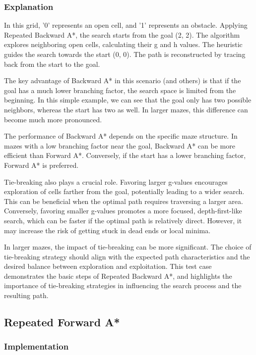 \documentclass[12pt]{article}
\begin{document}
\subsubsection{Explanation}

In this grid, 
'0' represents an open cell, 
and '1' represents an obstacle. 
Applying Repeated Backward A*, 
the search starts from the goal (2, 2). 
The algorithm explores neighboring open cells, 
calculating their g and h values. 
The heuristic guides the search towards the start (0, 0). 
The path is reconstructed by tracing back from the start to the goal.

The key advantage of Backward A* in this scenario 
(and others) 
is that if the goal has a much lower branching factor, 
the search space is limited from the beginning. 
In this simple example, 
we can see that the goal only has two possible neighbors, 
whereas the start has two as well. 
In larger mazes, 
this difference can become much more pronounced.

The performance of Backward A* depends on the specific maze structure. 
In mazes with a low branching factor near the goal, 
Backward A* can be more efficient than Forward A*. 
Conversely, 
if the start has a lower branching factor, 
Forward A* is preferred.

Tie-breaking also plays a crucial role. 
Favoring larger g-values encourages exploration of cells farther from the goal, 
potentially leading to a wider search. 
This can be beneficial when the optimal path requires traversing a larger area. 
Conversely, 
favoring smaller g-values promotes a more focused, 
depth-first-like search, 
which can be faster if the optimal path is relatively direct. 
However, 
it may increase the risk of getting stuck in dead ends or local minima.

In larger mazes, 
the impact of tie-breaking can be more significant. 
The choice of tie-breaking strategy should align with the expected path characteristics and the desired balance between exploration and exploitation. 
This test case demonstrates the basic steps of Repeated Backward A*,
and highlights the importance of tie-breaking strategies in influencing the search process and the resulting path.

\subsection{ Repeated Forward A* }

\subsubsection{Implementation}
\end{document}
